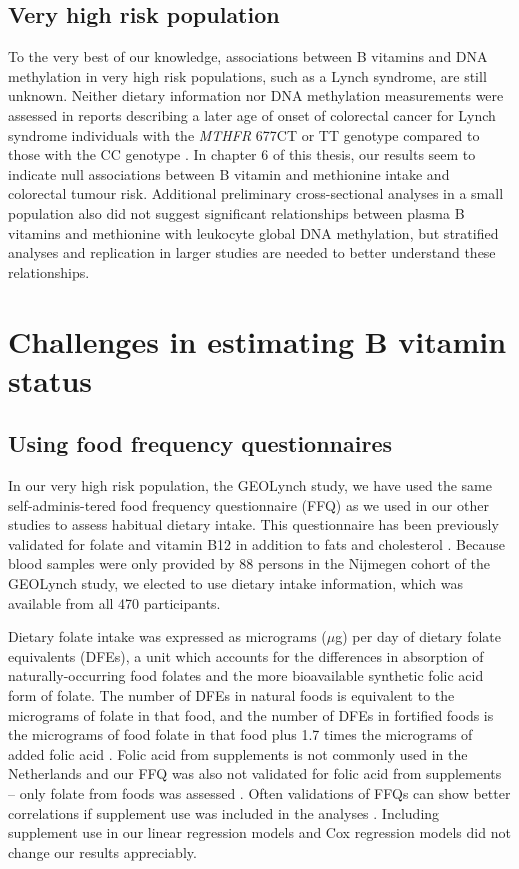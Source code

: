 \subsection{Very high risk population} %
\noindent To the very best of our knowledge, associations between B vitamins and DNA methylation in very high risk populations, such as a Lynch syndrome, are still unknown. Neither dietary information nor DNA methylation measurements were assessed in reports describing a later age of onset of colorectal cancer for Lynch syndrome individuals with the \emph{MTHFR} 677CT or TT genotype compared to those with the CC genotype \cite{c715,c716}. In chapter 6 of this thesis, our results seem to indicate null associations between B vitamin and methionine intake and colorectal tumour risk. Additional preliminary cross-sectional analyses in a small population also did not suggest significant relationships between plasma B vitamins and methionine with leukocyte global DNA methylation, but stratified analyses and replication in larger studies are needed to better understand these relationships.

\section{Challenges in estimating B vitamin status} %
\subsection{Using food frequency questionnaires} %
\noindent In our very high risk population, the GEOLynch study, we have used the same self-adminis-tered food frequency questionnaire (FFQ) as we used in our other studies to assess habitual dietary intake. This questionnaire has been previously validated for folate and vitamin B12 \cite{c717} in addition to fats and cholesterol \cite{c718}. Because blood samples were only provided by 88 persons in the Nijmegen cohort of the GEOLynch study, we elected to use dietary intake information, which was available from all 470 participants.

\noindent Dietary folate intake was expressed as micrograms ($\mu$g) per day of dietary folate equivalents (DFEs), a unit which accounts for the differences in absorption of naturally-occurring food folates and the more bioavailable synthetic folic acid form of folate. The number of DFEs in natural foods is equivalent to the micrograms of folate in that food, and the number of DFEs in fortified foods is the micrograms of food folate in that food plus 1.7 times the micrograms of added folic acid \cite{c719}. Folic acid from supplements is not commonly used in the Netherlands \cite{c720} and our FFQ was also not validated for folic acid from supplements -- only folate from foods was assessed \cite{c717}. Often validations of FFQs can show better correlations if supplement use was included in the analyses \cite{c721,c722,c723}. Including supplement use in our linear regression models and Cox regression models did not change our results appreciably.

